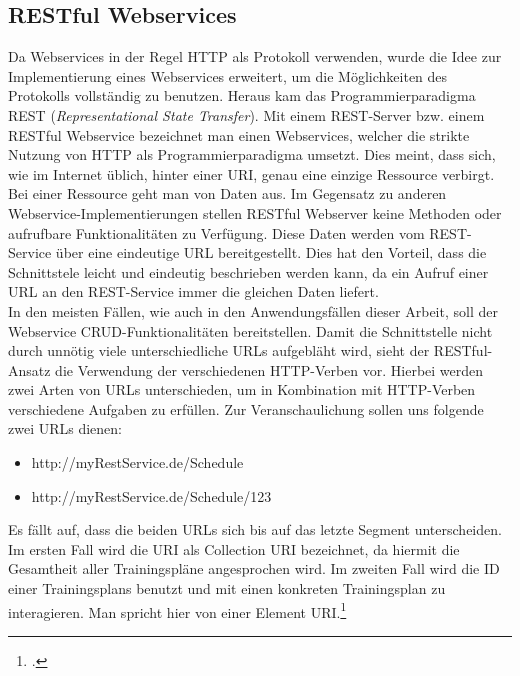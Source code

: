 \subsection{RESTful Webservices}
\label{sec:definition-rest}
Da Webservices in der Regel \ac{HTTP} als Protokoll verwenden, wurde die Idee zur Implementierung eines Webservices erweitert, um die Möglichkeiten des Protokolls vollständig zu benutzen. Heraus kam das Programmierparadigma REST (\textit{Representational State Transfer}). Mit einem REST-Server bzw. einem RESTful Webservice bezeichnet man einen Webservices, welcher die strikte Nutzung von HTTP als Programmierparadigma umsetzt.  Dies meint, dass sich, wie im Internet üblich, hinter einer \ac{URI}, genau eine einzige Ressource verbirgt. Bei einer Ressource geht man von Daten aus. Im Gegensatz zu anderen Webservice-Implementierungen stellen RESTful Webserver keine Methoden oder aufrufbare Funktionalitäten zu Verfügung. Diese Daten werden vom REST-Service über eine eindeutige URL bereitgestellt. Dies hat den Vorteil, dass die Schnittstele leicht und eindeutig beschrieben werden kann, da ein Aufruf einer URL an den REST-Service immer die gleichen Daten liefert. \\
In den meisten Fällen, wie auch in den Anwendungsfällen dieser Arbeit, soll der Webservice \ac{CRUD}-Funktionalitäten bereitstellen. Damit die Schnittstelle nicht durch unnötig viele unterschiedliche URLs aufgebläht wird, sieht der RESTful-Ansatz die Verwendung der verschiedenen HTTP-Verben vor. Hierbei werden zwei Arten von URLs unterschieden, um in Kombination mit HTTP-Verben verschiedene Aufgaben zu erfüllen. Zur Veranschaulichung sollen uns folgende zwei URLs dienen:
\begin{itemize}
\item http://myRestService.de/Schedule
\item http://myRestService.de/Schedule/123
\end{itemize}
Es fällt auf, dass die beiden URLs sich bis auf das letzte Segment unterscheiden. Im ersten Fall wird die URI als Collection URI bezeichnet, da hiermit die Gesamtheit aller Trainingspläne angesprochen wird. Im zweiten Fall wird die ID einer Trainingsplans benutzt und mit einen konkreten Trainingsplan zu interagieren. Man spricht hier von einer Element URI.\footcite[S. 12ff.]{Building-a-REST-Service}

